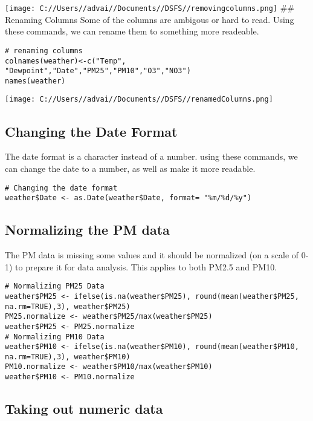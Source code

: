 \documentclass[
]{article}
\begin{document}
\texttt{[image: C://Users//advai//Documents//DSFS//removingcolumns.png]}
\#\# Renaming Columns Some of the columns are ambigous or hard to read.
Using these commands, we can rename them to something more readeable.

\begin{verbatim}
# renaming columns
colnames(weather)<-c("Temp", "Dewpoint","Date","PM25","PM10","O3","NO3")
names(weather)
\end{verbatim}

\texttt{[image: C://Users//advai//Documents//DSFS//renamedColumns.png]}

\hypertarget{changing-the-date-format}{%
\subsection{Changing the Date Format}\label{changing-the-date-format}}

The date format is a character instead of a number. using these
commands, we can change the date to a number, as well as make it more
readable.

\begin{verbatim}
# Changing the date format
weather$Date <- as.Date(weather$Date, format= "%m/%d/%y")
\end{verbatim}

\hypertarget{normalizing-the-pm-data}{%
\subsection{Normalizing the PM data}\label{normalizing-the-pm-data}}

The PM data is missing some values and it should be normalized (on a
scale of 0-1) to prepare it for data analysis. This applies to both
PM2.5 and PM10.

\begin{verbatim}
# Normalizing PM25 Data
weather$PM25 <- ifelse(is.na(weather$PM25), round(mean(weather$PM25, na.rm=TRUE),3), weather$PM25)
PM25.normalize <- weather$PM25/max(weather$PM25)
weather$PM25 <- PM25.normalize
# Normalizing PM10 Data
weather$PM10 <- ifelse(is.na(weather$PM10), round(mean(weather$PM10, na.rm=TRUE),3), weather$PM10)
PM10.normalize <- weather$PM10/max(weather$PM10)
weather$PM10 <- PM10.normalize
\end{verbatim}

\hypertarget{taking-out-numeric-data}{%
\subsection{Taking out numeric data}\label{taking-out-numeric-data}}
\end{document}
